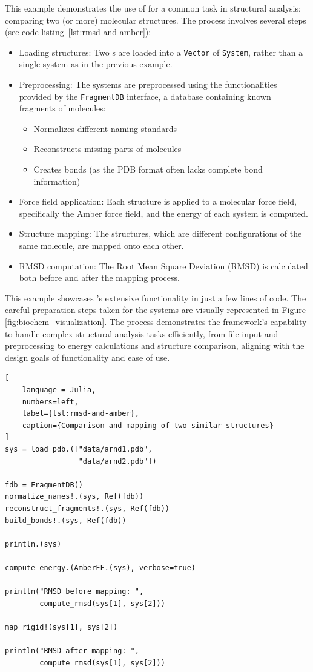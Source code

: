 This example demonstrates the use of \biochem for a common task in structural analysis: comparing two (or more) molecular structures. The process involves several steps (see code listing~\ref{lst:rmsd-and-amber}):
\begin{itemize}
	\item Loading structures: Two \pdb s are loaded into a \texttt{Vector} of \texttt{System}, rather than a single system as in the previous example.
	\item Preprocessing: The systems are preprocessed using the functionalities provided by the \texttt{FragmentDB} interface, a database containing known fragments of molecules: 
	\begin{itemize}
		\item Normalizes different naming standards
		\item Reconstructs missing parts of molecules
		\item Creates bonds (as the PDB format often lacks complete bond information)
	\end{itemize}
	\item Force field application: Each structure is applied to a molecular force field, specifically the Amber force field, and the energy of each system is computed.
	\item Structure mapping: The structures, which are different configurations of the same molecule, are mapped onto each other.
	\item RMSD computation: The Root Mean Square Deviation (RMSD) is calculated both before and after the mapping process.
\end{itemize}
This example showcases \biochem's extensive functionality in just a few lines of code. The careful preparation steps taken for the systems are visually represented in Figure \ref{fig:biochem_visualization}. The process demonstrates the framework's capability to handle complex structural analysis tasks efficiently, from file input and preprocessing to energy calculations and structure comparison, aligning with the design goals of functionality and ease of use.

\begin{lstlisting}[
    language = Julia, 
    numbers=left, 
    label={lst:rmsd-and-amber}, 
    caption={Comparison and mapping of two similar structures}
]
sys = load_pdb.(["data/arnd1.pdb", 
				 "data/arnd2.pdb"])

fdb = FragmentDB()
normalize_names!.(sys, Ref(fdb))
reconstruct_fragments!.(sys, Ref(fdb))
build_bonds!.(sys, Ref(fdb))

println.(sys)

compute_energy.(AmberFF.(sys), verbose=true)

println("RMSD before mapping: ", 
		compute_rmsd(sys[1], sys[2]))

map_rigid!(sys[1], sys[2])

println("RMSD after mapping: ", 
		compute_rmsd(sys[1], sys[2]))
\end{lstlisting}

